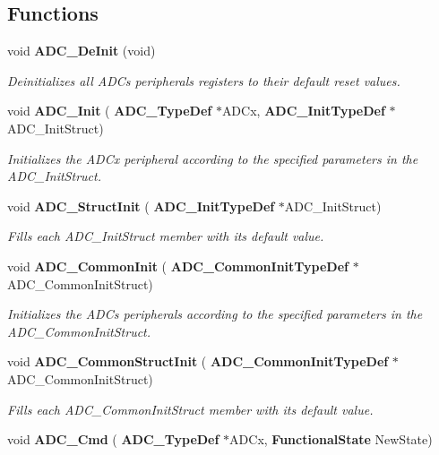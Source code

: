 \subsection*{Functions}
\begin{DoxyCompactItemize}
\item 
void \textbf{ A\+D\+C\+\_\+\+De\+Init} (void)
\begin{DoxyCompactList}\small\item\em Deinitializes all A\+D\+Cs peripherals registers to their default reset values. \end{DoxyCompactList}\item 
void \textbf{ A\+D\+C\+\_\+\+Init} (\textbf{ A\+D\+C\+\_\+\+Type\+Def} $\ast$A\+D\+Cx, \textbf{ A\+D\+C\+\_\+\+Init\+Type\+Def} $\ast$A\+D\+C\+\_\+\+Init\+Struct)
\begin{DoxyCompactList}\small\item\em Initializes the A\+D\+Cx peripheral according to the specified parameters in the A\+D\+C\+\_\+\+Init\+Struct. \end{DoxyCompactList}\item 
void \textbf{ A\+D\+C\+\_\+\+Struct\+Init} (\textbf{ A\+D\+C\+\_\+\+Init\+Type\+Def} $\ast$A\+D\+C\+\_\+\+Init\+Struct)
\begin{DoxyCompactList}\small\item\em Fills each A\+D\+C\+\_\+\+Init\+Struct member with its default value. \end{DoxyCompactList}\item 
void \textbf{ A\+D\+C\+\_\+\+Common\+Init} (\textbf{ A\+D\+C\+\_\+\+Common\+Init\+Type\+Def} $\ast$A\+D\+C\+\_\+\+Common\+Init\+Struct)
\begin{DoxyCompactList}\small\item\em Initializes the A\+D\+Cs peripherals according to the specified parameters in the A\+D\+C\+\_\+\+Common\+Init\+Struct. \end{DoxyCompactList}\item 
void \textbf{ A\+D\+C\+\_\+\+Common\+Struct\+Init} (\textbf{ A\+D\+C\+\_\+\+Common\+Init\+Type\+Def} $\ast$A\+D\+C\+\_\+\+Common\+Init\+Struct)
\begin{DoxyCompactList}\small\item\em Fills each A\+D\+C\+\_\+\+Common\+Init\+Struct member with its default value. \end{DoxyCompactList}\item 
void \textbf{ A\+D\+C\+\_\+\+Cmd} (\textbf{ A\+D\+C\+\_\+\+Type\+Def} $\ast$A\+D\+Cx, \textbf{ Functional\+State} New\+State)

\end{DoxyCompactItemize}
